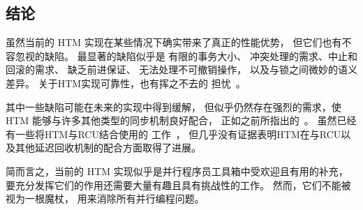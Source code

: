 \subsection{结论}
\label{sec:future:Conclusions}

虽然当前的 HTM 实现在某些情况下确实带来了真正的性能优势，
但它们也有不容忽视的缺陷。
最显著的缺陷似乎是
有限的事务大小、
冲突处理的需求、中止和回滚的需求、
缺乏前进保证、
无法处理不可撤销操作，
以及与锁之间微妙的语义差异。
关于HTM实现可靠性，也有挥之不去的
担忧~\cite{ChristianJacobi2012MainframeTM,ScottWasson2014HaswellDisableTSX,Intel2020HaswellTSXordering,Intel2021perfTSXordering,MichaelLarabel2021DisableTSX,PowerISA3.1-2020}。

其中一些缺陷可能在未来的实现中得到缓解，
但似乎仍然存在强烈的需求，使 HTM 能够与许多其他类型的同步机制良好配合，
正如之前所指出的~\cite{McKenney2007PLOSTM,PaulEMcKenney2010OSRGrassGreener}。
虽然已经有一些将HTM与RCU结合使用的
工作~\cite{Siakavaras2017CombiningHA,DimitriosSiakavaras2020RCU-HTM-B+Trees,ChristinaGiannoula2018HTM-RCU-graphcoloring,SeongJaePark2020HTMRCUlock}，
但几乎没有证据表明HTM在与RCU以及其他延迟回收机制的配合方面取得了进展。

简而言之，当前的 HTM 实现似乎是并行程序员工具箱中受欢迎且有用的补充，
要充分发挥它们的作用还需要大量有趣且具有挑战性的工作。
然而，它们不能被视为一根魔杖，
用来消除所有并行编程问题。

\QuickQuizEnd
